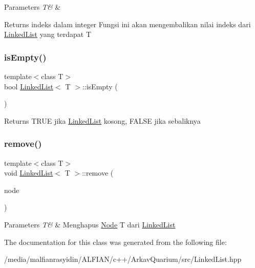 \begin{DoxyParams}{Parameters}
{\em T\&} & \\
\hline
\end{DoxyParams}
\begin{DoxyReturn}{Returns}
indeks dalam integer Fungsi ini akan mengembalikan nilai indeks dari \mbox{\hyperlink{class_linked_list}{Linked\+List}} yang terdapat T 
\end{DoxyReturn}
\mbox{\label{class_linked_list_a7ecbb28e82117a680839ed0dc28ebdce}} 
\subsubsection{\texorpdfstring{is\+Empty()}{isEmpty()}}
{\footnotesize\ttfamily template$<$class T$>$ \\
bool \mbox{\hyperlink{class_linked_list}{Linked\+List}}$<$ T $>$\+::is\+Empty (\begin{DoxyParamCaption}{ }\end{DoxyParamCaption})\hspace{0.3cm}{\ttfamily [inline]}}

\begin{DoxyReturn}{Returns}
T\+R\+UE jika \mbox{\hyperlink{class_linked_list}{Linked\+List}} kosong, F\+A\+L\+SE jika sebaliknya 
\end{DoxyReturn}
\mbox{\label{class_linked_list_a72cee7f68addc8190e5be9eeb966687c}} 
\subsubsection{\texorpdfstring{remove()}{remove()}}
{\footnotesize\ttfamily template$<$class T$>$ \\
void \mbox{\hyperlink{class_linked_list}{Linked\+List}}$<$ T $>$\+::remove (\begin{DoxyParamCaption}\item[{T \&}]{node }\end{DoxyParamCaption})\hspace{0.3cm}{\ttfamily [inline]}}


\begin{DoxyParams}{Parameters}
{\em T\&} & Menghapus \mbox{\hyperlink{class_node}{Node}} T dari \mbox{\hyperlink{class_linked_list}{Linked\+List}} \\
\hline
\end{DoxyParams}


The documentation for this class was generated from the following file\+:\begin{DoxyCompactItemize}
\item 
/media/malfianrasyidin/\+A\+L\+F\+I\+A\+N/c++/\+Arkav\+Quarium/src/Linked\+List.\+hpp\end{DoxyCompactItemize}
